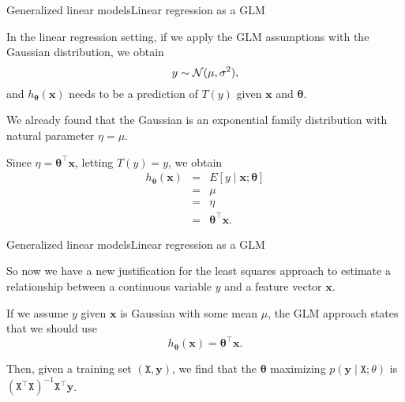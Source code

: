 \documentclass{beamer}
\renewcommand{\vec}[1]{\boldsymbol{#1}}
\newcommand{\mat}[1]{\mathtt{#1}}
\begin{document}
\begin{frame}{Generalized linear models}{Linear regression as a GLM}

  In the linear regression setting, if we apply the GLM assumptions with
  the Gaussian distribution, we obtain
  \[ y \sim {\cal N}(\mu, \sigma^2), \]
  and $h_{\vec{\theta}}(\vec{x})$ needs to be a prediction of $T(y)$
  given $\vec{x}$ and $\vec{\theta}$.

  \medskip
  
  We already found that the Gaussian is an exponential family distribution with
  natural parameter $\eta = \mu$.

  \medskip

  Since $\eta = \vec{\theta}^\top \vec{x}$, letting $T(y)=y$, we obtain
  \begin{eqnarray}
    h_{\vec{\theta}}(\vec{x}) & = & E[y \mid \vec{x} ; \vec{\theta} ] \nonumber \\
    & = & \mu \nonumber \\
    & = & \eta \nonumber \\
    & = & \vec{\theta}^\top \vec{x} .\nonumber
  \end{eqnarray}
  
\end{frame}


\begin{frame}{Generalized linear models}{Linear regression as a GLM}

  So now we have a new justification for the least squares approach to
  estimate a relationship between a continuous variable $y$ and a
  feature vector $\vec{x}$.

  \medskip

  If we assume $y$ given $\vec{x}$ is Gaussian with some mean $\mu$,
  the GLM approach states that we should use
  \[ h_{\vec{\theta}}(\vec{x}) = \vec{\theta}^\top \vec{x} .\]

  Then, given a training set $(\mat{X},\vec{y})$, we find that the
  $\vec{\theta}$ maximizing $p(\vec{y} \mid \mat{X} ; \theta)$ is
  $(\mat{X}^\top\mat{X})^{-1}\mat{X}^\top\vec{y}$.

\end{frame}
\end{document}

